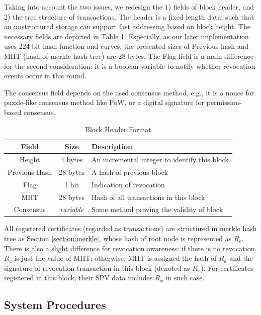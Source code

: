 \documentclass[conference]{IEEEtran}
\begin{document}
Taking into account the two issues, we redesign the 1) fields of block header, and 2) the tree structure of transactions. The header is a fixed length data, such that an unstructured storage can support fast addressing based on block height. The necessary fields are depicted in Table \ref{table:format}. Especially, as our later implementation uses 224-bit hash function and curves, the presented sizes of Previous hash and MHT (hash of merkle hash tree) are 28 bytes. The Flag field is a main difference for the second consideration: it is a boolean variable to notify whether revocation events occur in this round.

The consensus field depends on the used consensus method, e.g., it is a nonce for puzzle-like consensus method like PoW, or a digital signature for permission-based consensus.


\begin{table}[h] 
	\caption{Block Header Format}\label{table:format}
	\centering
	\begin{tabular}{c|c|l}
		\hline
		Field & Size & Description \\
		\hline
		Height & 4 bytes & An incremental integer to identify this block \\
		Previous Hash & 28 bytes & A hash of previous block \\
		Flag & 1 bit & Indication of revocation \\
		MHT & 28 bytes & Hash of all transactions in this block \\
		Consensus & \textit{variable} & Some method proving the validity of block\\
		\hline
	\end{tabular}
\end{table}

All registered certificates (regarded as transactions) are structured in merkle hash tree as Section \ref{section:merkle}, whose hash of root node is represented as $R_c$. There is also a slight difference for revocation awareness: if there is no revocation, $R_c$ is just the value of MHT; otherwise, MHT is assigned the hash of $R_a$ and the signature of revocation transaction in this block (denoted as $R_x$). For certificates registered in this block, their SPV data includes $R_x$ in such case.


\subsection{System Procedures}
\end{document}
